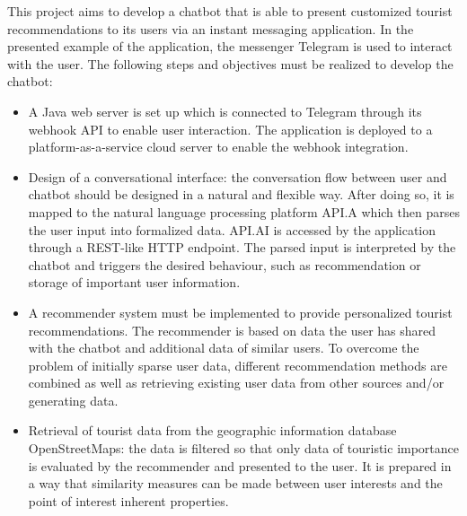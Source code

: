 
This project aims to develop a chatbot that is able to present customized tourist recommendations to its users via an instant messaging application. In the presented example of the application, the messenger Telegram is used to interact with the user. 
The following steps and objectives must be realized to develop the chatbot:
\begin{itemize}
\item A Java web server is set up which is connected to Telegram through its webhook API to enable user interaction. The application is deployed to a platform-as-a-service cloud server to enable the webhook integration.
 
\item Design of a conversational interface: the conversation flow between user and chatbot should be designed in a natural and flexible way. After doing so, it is mapped to the natural language processing platform API.A which then parses the user input into formalized data. API.AI is accessed by the application through a REST-like HTTP endpoint. The parsed input is interpreted by the chatbot and triggers the desired behaviour, such as recommendation or storage of important user information.  

\item A recommender system must be implemented to provide personalized tourist recommendations. The recommender is based on data the user has shared with the chatbot and additional data of similar users. To overcome the problem of initially sparse user data, different recommendation methods are combined as well as retrieving existing user data from other sources and/or generating data.

\item Retrieval of tourist data from the geographic information database OpenStreetMaps: the data is filtered so that only data of touristic importance is evaluated by the recommender and presented to the user. It is prepared in a way that similarity measures can be made between user interests and the point of interest inherent properties.
\end{itemize}
